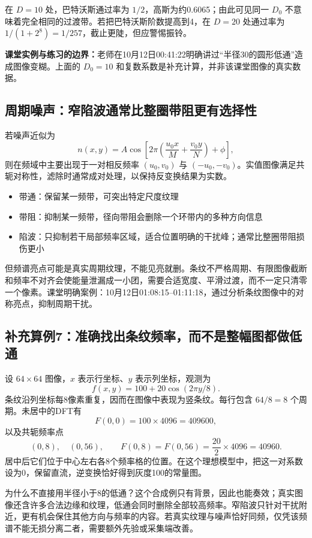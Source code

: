 在 $D=10$ 处，巴特沃斯通过率为 $1/2$，高斯为约0.6065；由此可见同一 $D_0$ 不意味着完全相同的过渡带。若把巴特沃斯阶数提高到4，在 $D=20$ 处通过率为 $1/(1+2^8)=1/257$，截止更陡，但应警惕振铃。

\textbf{课堂实例与练习的边界：}老师在10月12日00:41:22明确讲过“半径30的圆形低通”造成图像变糊。上面的 $D_0=10$ 和复数系数是补充计算，并非该课堂图像的真实数据。

\subsection{周期噪声：窄陷波通常比整圈带阻更有选择性}
若噪声近似为
\[
n(x,y)=A\cos\left[2\pi\left(\frac{u_0x}{M}+\frac{v_0y}{N}\right)+\phi\right],
\]
则在频域中主要出现于一对相反频率 $(u_0,v_0)$ 与 $(-u_0,-v_0)$。实值图像满足共轭对称性，滤除时通常成对处理，以保持反变换结果为实数。

\begin{itemize}
\item 带通：保留某一频带，可突出特定尺度纹理
\item 带阻：抑制某一频带，径向带阻会删除一个环带内的多种方向信息
\item 陷波：只抑制若干局部频率区域，适合位置明确的干扰峰；通常比整圈带阻损伤更小
\end{itemize}
但频谱亮点可能是真实周期纹理，不能见亮就删。条纹不严格周期、有限图像截断和频率不对齐会使能量泄漏成一小团，需要合适宽度、平滑过渡，而不一定只清零一个像素。课堂明确案例：10月12日01:08:15--01:11:18，通过分析条纹图像中的对称亮点，抑制周期干扰。

\subsection{补充算例7：准确找出条纹频率，而不是整幅图都做低通}
设 $64\times64$ 图像，$x$ 表示行坐标、$y$ 表示列坐标，观测为
\[
f(x,y)=100+20\cos(2\pi y/8).
\]
条纹沿列坐标每8像素重复，因而在图像中表现为竖条纹。每行包含 $64/8=8$ 个周期。未居中的DFT有
\[
F(0,0)=100\times4096=409600,
\]
以及共轭频率点
\[
(0,8),\quad(0,56),\qquad
F(0,8)=F(0,56)=\frac{20}{2}\times4096=40960.
\]
居中后它们位于中心左右各8个频率格的位置。在这个理想模型中，把这一对系数设为0，保留直流，逆变换恰好得到灰度100的常量图。

为什么不直接用半径小于8的低通？这个合成例只有背景，因此也能奏效；真实图像还含许多合法边缘和纹理，低通会同时删除全部较高频率。窄陷波只针对干扰附近，更有机会保住其他方向与频率的内容。若真实纹理与噪声恰好同频，仅凭该频谱不能无损分离二者，需要额外先验或采集端改善。

